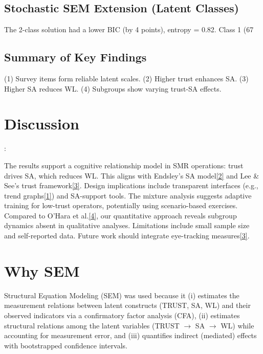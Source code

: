 \documentclass[conference]{IEEEtran}
\begin{document}
\subsection{Stochastic SEM Extension (Latent Classes)}
The 2-class solution had a lower BIC (by 4 points), entropy = 0.82. Class 1 (67%

\subsection{Summary of Key Findings}
(1) Survey items form reliable latent scales. (2) Higher trust enhances SA. (3) Higher SA reduces WL. (4) Subgroups show varying trust-SA effects.

\section{Discussion}:  

The results support a cognitive relationship model in SMR operations: trust drives SA, which reduces WL. This aligns with Endsley’s SA model\href{https://www.tandfonline.com/doi/abs/10.1177/001872089503700103}{[2]} and Lee & See’s trust framework\href{https://www.tandfonline.com/doi/abs/10.1518/hfes.46.1.50_30392}{[3]}. Design implications include transparent interfaces (e.g., trend graphs\href{https://www.researchgate.net/publication/337420277_Designing_for_Situation_Awareness_in_the_Main_Control_Room_of_a_Small_Modular_Reactor}{[1]}) and SA-support tools. The mixture analysis suggests adaptive training for low-trust operators, potentially using scenario-based exercises. Compared to O’Hara et al.\href{https://www.nrc.gov/docs/ML1213/ML12131A074.pdf}{[4]}, our quantitative approach reveals subgroup dynamics absent in qualitative analyses. Limitations include small sample size and self-reported data. Future work should integrate eye-tracking measures\href{https://www.tandfonline.com/doi/abs/10.1177/1541931219631072}{[3]}. 


\section{Why SEM}
Structural Equation Modeling (SEM) was used because it (i) estimates the measurement relations between latent constructs (TRUST, SA, WL) and their observed indicators via a confirmatory factor analysis (CFA), (ii) estimates structural relations among the latent variables (TRUST $\rightarrow$ SA $\rightarrow$ WL) while accounting for measurement error, and (iii) quantifies indirect (mediated) effects with bootstrapped confidence intervals.
\end{document}

